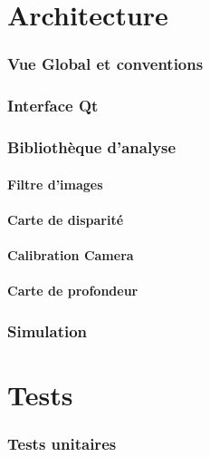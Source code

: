 \documentclass{article}
\begin{document}
\newpage
\part{Architecture}


\newpage
\section{Vue Global et conventions}

\newpage
\section{Interface Qt}

\newpage
\section{Bibliothèque d'analyse}

\newpage
\subsection{Filtre d'images}

\newpage
\subsection{Carte de disparité}

\newpage
\subsection{Calibration Camera}

\newpage
\subsection{Carte de profondeur}

\newpage
\section{Simulation}

\newpage
\part{Tests}

\newpage
\section{Tests unitaires}
\end{document}
